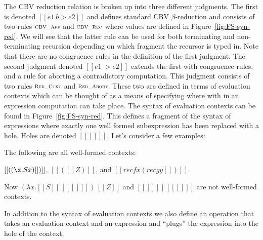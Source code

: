 The CBV reduction relation is broken up into three different
judgments.  The first is denoted $[[e1 ~b> e2]]$ and defines standard
CBV $\beta$-reduction and consists of two rules
$\textsc{\scriptsize CBV\_App}$ and $\textsc{\scriptsize CBV\_Rec}$ where values are
defined in Figure~\ref{fig:FS-syn-red}.  We will see that the latter rule
can be used for both terminating and non-terminating recursion
depending on which fragment the recursor is typed in.  Note that there
are no congruence rules in the definition of the first judgment.  The
second judgment denoted $[[e1 ~> e2]]$ extends the first with
congruence rules, and a rule for aborting a contradictory computation.
This judgment consists of two rules $\textsc{\scriptsize Red\_Ctxt}$ and
$\textsc{\scriptsize Red\_Abort}$.  These two are defined in terms of
evaluation contexts which can be thought of as a means of specifying
where with in an expression computation can take place. The syntax of
evaluation contexts can be found in Figure~\ref{fig:FS-syn-red}.  This
defines a fragment of the syntax of expressions where exactly one well
formed subexpression has been replaced with a hole.  Holes are denoted
$[[ [] ]]$. Let's consider a few examples:
\begin{example}
  \label{ex:FS-WF-ECTX}
  The following are all well-formed contexts:
  \begin{center}
    $[[((\x.S x) []) ]]$, $[[ ([] Z)]]$, and $[[rec f x (rec g y [])]]$.
  \end{center}
  Now $(\lambda x.[[S]]\,[[ [] ]])\,[[Z]]$ and $[[ [] ]]\,[[ [] ]]$
  are not well-formed contexts.
\end{example}
\noindent
In addition to the syntax of evaluation contexts we also define an
operation that takes an evaluation context and an expression and
``plugs'' the expression into the hole of the context.  


